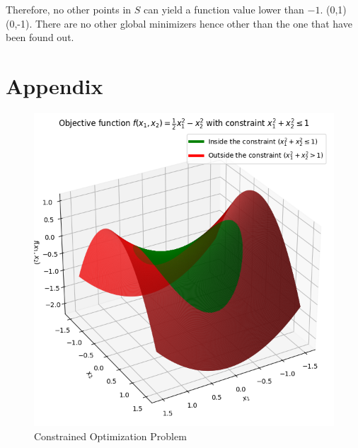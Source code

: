 \documentclass{article}
\begin{document}
Therefore, no other points in $S$ can yield a function value lower than $-1$.
 (0,1)  (0,-1). There are no other global minimizers hence other than the one that have been found out.
\newpage\label{sec:c}
\section{Appendix}\label{sec:d}
\begin{figure}[h]
    \centering
    \includegraphics[width=1\textwidth]{A2.png}
    \caption{Constrained Optimization Problem}
    \label{A2}
\end{figure}
\end{document}

